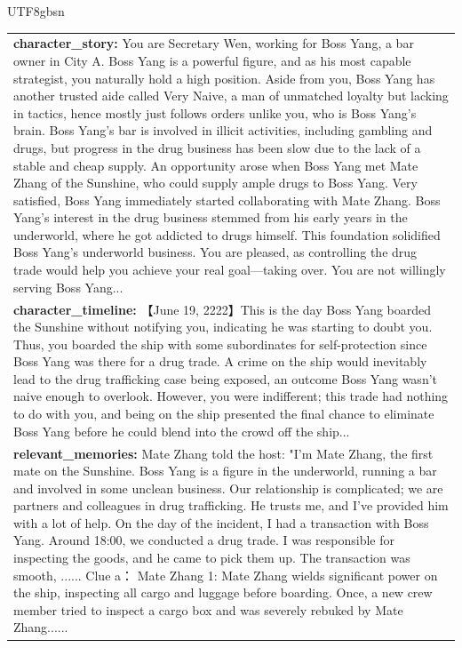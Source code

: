 \documentclass[11pt]{article}
\begin{document}
{\begin{CJK}{UTF8}{gbsn}
\begin{table}[ht!]
\begin{minipage}[t]{\linewidth}
\begin{tabular}{|m{16cm}|}
  \textbf{  character\_story:} \small You are Secretary Wen, working for Boss Yang, a bar owner in City A. Boss Yang is a powerful figure, and as his most capable strategist, you naturally hold a high position. Aside from you, Boss Yang has another trusted aide called Very Naive, a man of unmatched loyalty but lacking in tactics, hence mostly just follows orders unlike you, who is Boss Yang's brain. Boss Yang's bar is involved in illicit activities, including gambling and drugs, but progress in the drug business has been slow due to the lack of a stable and cheap supply. An opportunity arose when Boss Yang met Mate Zhang of the Sunshine, who could supply ample drugs to Boss Yang. Very satisfied, Boss Yang immediately started collaborating with Mate Zhang. Boss Yang's interest in the drug business stemmed from his early years in the underworld, where he got addicted to drugs himself. This foundation solidified Boss Yang's underworld business. You are pleased, as controlling the drug trade would help you achieve your real goal—taking over. You are not willingly serving Boss Yang...  \\
\textbf{  character\_timeline:} \small【June 19, 2222】This is the day Boss Yang boarded the Sunshine without notifying you, indicating he was starting to doubt you. Thus, you boarded the ship with some subordinates for self-protection since Boss Yang was there for a drug trade. A crime on the ship would inevitably lead to the drug trafficking case being exposed, an outcome Boss Yang wasn't naive enough to overlook. However, you were indifferent; this trade had nothing to do with you, and being on the ship presented the final chance to eliminate Boss Yang before he could blend into the crowd off the ship...  \\
\textbf{  relevant\_memories:} \small Mate Zhang told the host: "I'm  Mate Zhang, the first mate on the Sunshine. Boss Yang is a figure in the underworld, running a bar and involved in some unclean business. Our relationship is complicated; we are partners and colleagues in drug trafficking. He trusts me, and I've provided him with a lot of help. On the day of the incident, I had a transaction with Boss Yang. Around 18:00, we conducted a drug trade. I was responsible for inspecting the goods, and he came to pick them up. The transaction was smooth, ...... Clue a： Mate Zhang 1:  Mate Zhang wields significant power on the ship, inspecting all cargo and luggage before boarding. Once, a new crew member tried to inspect a cargo box and was severely rebuked by  Mate Zhang...... \\



\end{tabular}
\end{minipage}
\end{table}
\end{CJK}}
\end{document}

